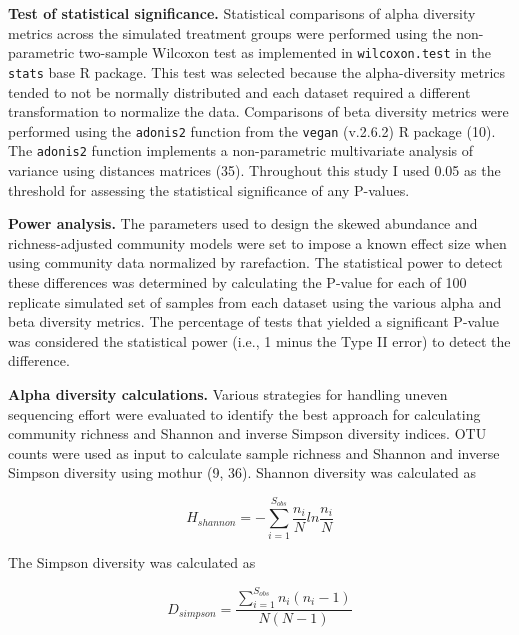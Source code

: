 \documentclass[
]{article}
\begin{document}
\textbf{Test of statistical significance.} Statistical comparisons of
alpha diversity metrics across the simulated treatment groups were
performed using the non-parametric two-sample Wilcoxon test as
implemented in \texttt{wilcoxon.test} in the \texttt{stats} base R
package. This test was selected because the alpha-diversity metrics
tended to not be normally distributed and each dataset required a
different transformation to normalize the data. Comparisons of beta
diversity metrics were performed using the \texttt{adonis2} function
from the \texttt{vegan} (v.2.6.2) R package (10). The \texttt{adonis2}
function implements a non-parametric multivariate analysis of variance
using distances matrices (35). Throughout this study I used 0.05 as the
threshold for assessing the statistical significance of any P-values.

\textbf{Power analysis.} The parameters used to design the skewed
abundance and richness-adjusted community models were set to impose a
known effect size when using community data normalized by rarefaction.
The statistical power to detect these differences was determined by
calculating the P-value for each of 100 replicate simulated set of
samples from each dataset using the various alpha and beta diversity
metrics. The percentage of tests that yielded a significant P-value was
considered the statistical power (i.e., 1 minus the Type II error) to
detect the difference.

\textbf{Alpha diversity calculations.} Various strategies for handling
uneven sequencing effort were evaluated to identify the best approach
for calculating community richness and Shannon and inverse Simpson
diversity indices. OTU counts were used as input to calculate sample
richness and Shannon and inverse Simpson diversity using mothur (9, 36).
Shannon diversity was calculated as

\[H_{shannon} = - \sum_{i=1}^{S_{obs}} \frac{n_i}{N} ln \frac{n_i}{N}\]

The Simpson diversity was calculated as

\[D_{simpson} = \frac {\sum_{i=1}^{S_{obs}} {n_i \left ( n_i - 1 \right )}}{N \left( N-1 \right )}\]
\end{document}
